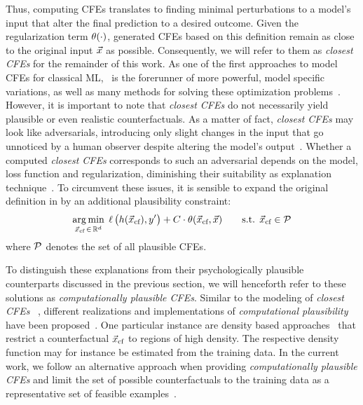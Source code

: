 Thus, computing \glspl{CFE} translates to finding minimal perturbations to a model's input that alter the final prediction to a desired outcome. Given the regularization term $\operatorname*{{\theta}}(\cdot)$, generated \glspl{CFE} based on this definition remain as close to the original input $\vec{x}$ as possible. Consequently, we will refer to them as \textit{closest \glspl{CFE}} for the remainder of this work.
As one of the first approaches to model \glspl{CFE} for classical \gls{ML},~ is the 
forerunner of more powerful, model specific variations, as well as many methods for solving these optimization problems~\citep{verma_counterfactual_2020,artelt_computation_2019,karimi_survey_2020}.
However, it is important to note that \textit{closest \glspl{CFE}} do not necessarily yield plausible or even realistic counterfactuals.
As a matter of fact, \textit{closest \glspl{CFE}} may look like adversarials, introducing only slight changes in the input that go unnoticed by a human observer despite altering the model's output~\citep{papernot_practical_2017}. 
Whether a computed \textit{closest \glspl{CFE}} corresponds to such an adversarial depends on the model, loss function and regularization, diminishing their suitability as explanation technique~\citep{laugel_issues_2019}.
To circumvent these issues, it is sensible to expand the original definition in  by an additional plausibility constraint:
\begin{equation}
\begin{split}
\underset{{\vec{x}_{\text{cf}}} \,\in\, \mathbb{R}^d}{\arg\min}\; \operatorname*{{\ell}}\big(h({\vec{x}_{\text{cf}}}), y'\big) + C \cdot \operatorname*{{\theta}}({\vec{x}_{\text{cf}}}, \vec{x}) \quad\quad \text{s.t. } {\vec{x}_{\text{cf}}} \in \mathcal{P}
\end{split}
\end{equation}
where $\mathcal{P}$ denotes the set of all plausible \glspl{CFE}.

To distinguish these explanations from their psychologically plausible counterparts discussed in the previous section, we will henceforth refer to these solutions as \textit{computationally plausible \glspl{CFE}}.
Similar to the modeling of \textit{closest \glspl{CFE}} ~, different realizations and implementations of \textit{computational plausibility} have been proposed~\citep{looveren_interpretable_2019,poyiadzi_face_2019,artelt_convex_2020}. 
One particular instance are density based approaches~\citep{artelt_convex_2020} that restrict a counterfactual ${\vec{x}_{\text{cf}}}$ to regions of high density. 
The respective density function may for instance be estimated from the training data.
In the current work, we follow an alternative approach when providing \textit{computationally plausible \glspl{CFE}} and limit the set of possible counterfactuals to the training data as a representative set of feasible examples~\citep{poyiadzi_face_2019}.

